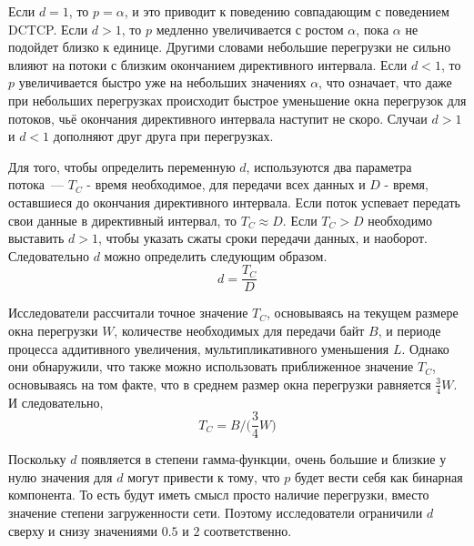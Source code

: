 \documentclass[14pt, a4paper,oneside]{extarticle}
\begin{document}
Если $d = 1$, то $p = \alpha$, и это приводит к поведению совпадающим с поведением DCTCP. Если $d > 1$, то $p$ медленно увеличивается с ростом $\alpha$, пока $\alpha$ не подойдет близко к единице. Другими словами небольшие перегрузки не сильно влияют на потоки с близким окончанием директивного интервала. Если $d < 1$, то $p$ увеличивается быстро уже на небольших значениях $\alpha$, что означает, что даже при небольших перегрузках происходит быстрое уменьшение окна перегрузок для потоков, чьё окончания директивного интервала наступит не скоро.
Случаи $d > 1$ и $d < 1$ дополняют друг друга при перегрузках.
 
Для того, чтобы определить переменную $d$, используются два параметра потока~--- $T_C$ - время необходимое, для передачи всех данных и $D$ - время, оставшиеся до окончания директивного интервала. Если поток успевает передать свои данные в директивный интервал, то $T_C \approx D$. Если $T_C > D$ необходимо выставить $d > 1$, чтобы указать сжаты сроки передачи данных, и наоборот. Следовательно $d$ можно определить следующим образом.
$$ d = \frac{T_C}{D}$$

Исследователи рассчитали точное значение $T_C$, основываясь на текущем размере окна перегрузки $W$, количестве необходимых для передачи байт $B$, и периоде процесса аддитивного увеличения, мультипликативного уменьшения $L$. Однако они обнаружили, что также можно использовать приближенное значение $T_C$, основываясь на том факте, что в среднем размер окна перегрузки равняется $\frac{3}{4}W$. И следовательно,
$$T_C = B / \big( \frac{3}{4}W \big)$$ 

Поскольку $d$ появляется в степени гамма-функции, очень большие и близкие у нулю значения для $d$ могут привести к тому, что $p$ будет вести себя как бинарная компонента. То есть будут иметь смысл просто наличие перегрузки, вместо значение степени загруженности сети. Поэтому исследователи ограничили $d$ сверху и снизу значениями $0.5$  и $2$ соответственно.

\newpage
\end{document}
